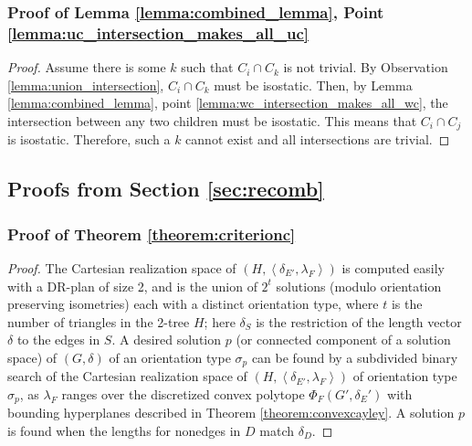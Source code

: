 \subsubsection{Proof of Lemma \ref{lemma:combined_lemma}, Point \ref{lemma:uc_intersection_makes_all_uc}}

\begin{proof}
Assume there is some $k$ such that $C_i\cap C_k$ is not trivial. By Observation \ref{lemma:union_intersection}, $C_i\cap C_k$ must be isostatic. Then, by Lemma \ref{lemma:combined_lemma}, point \ref{lemma:wc_intersection_makes_all_wc}, the intersection between any two children must be isostatic. This means that $C_i\cap C_j$ is isostatic. Therefore, such a $k$ cannot exist and all intersections are trivial.
\end{proof}






\subsection{Proofs from Section \ref{sec:recomb}}



\subsubsection{Proof of Theorem \ref{theorem:criterionc}}
\begin{proof}
    The Cartesian realization space of $(H,\left<\delta_{E'}, \lambda_F\right>)$ is computed easily with a DR-plan of size 2, and is the union of $2^t$ solutions (modulo orientation preserving isometries) each with a distinct orientation type, where $t$ is the number of triangles in the 2-tree $H$; here $\delta_{S}$ is the restriction of the length vector $\delta$ to the edges in $S$. A desired solution $p$ (or connected component of a solution space) of $(G,\delta)$ of an orientation type $\sigma_p$ can be found by a subdivided binary search of the Cartesian realization space of $(H, \left<\delta_{E'}, \lambda_F\right>)$ of orientation type $\sigma_p$, as $\lambda_F$ ranges over the discretized convex polytope $\Phi_F(G',\delta_E')$ with bounding hyperplanes described in Theorem \ref{theorem:convexcayley}. A solution $p$ is found  when the lengths for nonedges in $D$ match $\delta_D$.
\end{proof}


